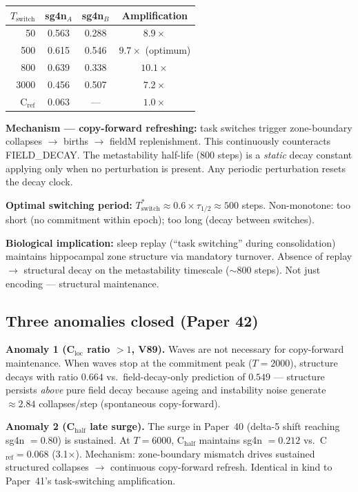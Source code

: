 \documentclass[11pt]{article}
\begin{document}
\begin{center}
\begin{tabular}{rccc}
\toprule
$T_\mathrm{switch}$ & sg4n$_A$ & sg4n$_B$ & Amplification \\
\midrule
50   & 0.563 & 0.288 & $8.9\times$ \\
500  & 0.615 & 0.546 & $9.7\times$ (optimum) \\
800  & 0.639 & 0.338 & $10.1\times$ \\
3000 & 0.456 & 0.507 & $7.2\times$ \\
C$_\mathrm{ref}$ & 0.063 & --- & $1.0\times$ \\
\bottomrule
\end{tabular}
\end{center}

\textbf{Mechanism --- copy-forward refreshing:}
task switches trigger zone-boundary collapses $\to$ births $\to$ fieldM replenishment.
This continuously counteracts FIELD\_DECAY. The metastability half-life (800 steps) is a
\emph{static} decay constant applying only when no perturbation is present.
Any periodic perturbation resets the decay clock.

\textbf{Optimal switching period:}
$T_\mathrm{switch}^* \approx 0.6 \times \tau_{1/2} \approx 500$ steps.
Non-monotone: too short (no commitment within epoch); too long (decay between switches).

\textbf{Biological implication:}
sleep replay (``task switching'' during consolidation) maintains hippocampal zone structure
via mandatory turnover.
Absence of replay $\to$ structural decay on the metastability timescale ($\sim 800$ steps).
Not just encoding --- structural maintenance.

\subsection{Three anomalies closed (Paper 42)}

\textbf{Anomaly 1 (C$_\mathrm{loc}$ ratio $> 1$, V89).}
Waves are not necessary for copy-forward maintenance.
When waves stop at the commitment peak ($T = 2000$), structure decays with ratio $0.664$
vs.\ field-decay-only prediction of $0.549$ --- structure persists \emph{above} pure field
decay because ageing and instability noise generate $\approx 2.84$ collapses/step (spontaneous
copy-forward).

\textbf{Anomaly 2 (C$_\mathrm{half}$ late surge).}
The surge in Paper~40 (delta-5 shift reaching sg4n $= 0.80$) is sustained.
At $T = 6000$, C$_\mathrm{half}$ maintains sg4n $= 0.212$ vs.\ C$_\mathrm{ref} = 0.068$
(3.1$\times$).
Mechanism: zone-boundary mismatch drives sustained structured collapses $\to$ continuous
copy-forward refresh.
Identical in kind to Paper~41's task-switching amplification.
\end{document}
